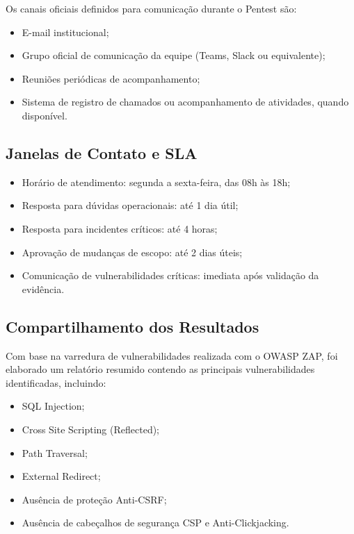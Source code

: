 Os canais oficiais definidos para comunicação durante o Pentest são:

\begin{itemize}
\item E-mail institucional;
\item Grupo oficial de comunicação da equipe (Teams, Slack ou equivalente);
\item Reuniões periódicas de acompanhamento;
\item Sistema de registro de chamados ou acompanhamento de atividades, quando
disponível.
\end{itemize}

\subsection{Janelas de Contato e SLA}

\begin{itemize}
\item Horário de atendimento: segunda a sexta-feira, das 08h às 18h;
\item Resposta para dúvidas operacionais: até 1 dia útil;
\item Resposta para incidentes críticos: até 4 horas;
\item Aprovação de mudanças de escopo: até 2 dias úteis;
\item Comunicação de vulnerabilidades críticas: imediata após validação da
evidência.
\end{itemize}

\subsection{Compartilhamento dos Resultados}

Com base na varredura de vulnerabilidades realizada com o OWASP ZAP, foi
elaborado um relatório resumido contendo as principais vulnerabilidades
identificadas, incluindo:

\begin{itemize}
\item SQL Injection;
\item Cross Site Scripting (Reflected);
\item Path Traversal;
\item External Redirect;
\item Ausência de proteção Anti-CSRF;
\item Ausência de cabeçalhos de segurança CSP e Anti-Clickjacking.
\end{itemize}

